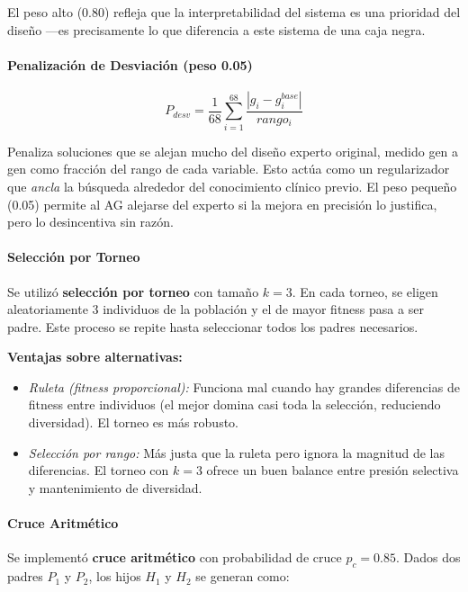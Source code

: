 \documentclass[11pt]{article}
\begin{document}
El peso alto (0.80) refleja que la interpretabilidad del sistema es una prioridad del dise\~no ---es precisamente lo que diferencia a este sistema de una caja negra.

\paragraph{Penalización de Desviación (peso 0.05)}

\begin{equation}
    P_{desv} = \frac{1}{68} \sum_{i=1}^{68} \frac{|g_i - g_i^{base}|}{rango_i}
\end{equation}

Penaliza soluciones que se alejan mucho del dise\~no experto original, medido gen a gen como fracci\'on del rango de cada variable. Esto act\'ua como un regularizador que \textit{ancla} la b\'usqueda alrededor del conocimiento cl\'inico previo. El peso peque\~no (0.05) permite al AG alejarse del experto si la mejora en precisi\'on lo justifica, pero lo desincentiva sin raz\'on.

\paragraph{Selección por Torneo}

Se utiliz\'o \textbf{selecci\'on por torneo} con tama\~no $k = 3$. En cada torneo, se eligen aleatoriamente 3 individuos de la poblaci\'on y el de mayor fitness pasa a ser padre. Este proceso se repite hasta seleccionar todos los padres necesarios.

\textbf{Ventajas sobre alternativas:}
\begin{itemize}
    \item \textit{Ruleta (fitness proporcional):} Funciona mal cuando hay grandes diferencias de fitness entre individuos (el mejor domina casi toda la selecci\'on, reduciendo diversidad). El torneo es m\'as robusto.
    \item \textit{Selecci\'on por rango:} M\'as justa que la ruleta pero ignora la magnitud de las diferencias. El torneo con $k=3$ ofrece un buen balance entre presi\'on selectiva y mantenimiento de diversidad.
\end{itemize}

\paragraph{Cruce Aritmético}

Se implement\'o \textbf{cruce aritm\'etico} con probabilidad de cruce $p_c = 0.85$. Dados dos padres $P_1$ y $P_2$, los hijos $H_1$ y $H_2$ se generan como:
\end{document}
